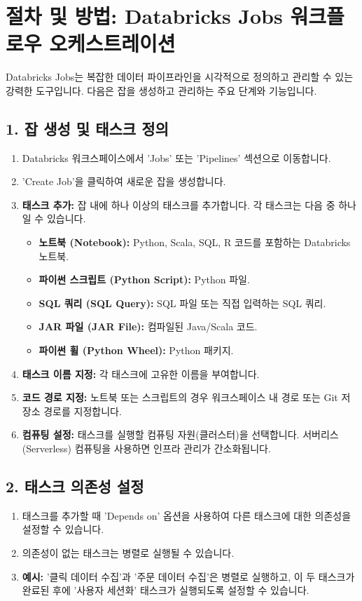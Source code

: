 \documentclass[11pt,a4paper]{article}
\theoremstyle{definition}
\begin{document}
\newpage
\section{절차 및 방법: Databricks Jobs 워크플로우 오케스트레이션}

Databricks Jobs는 복잡한 데이터 파이프라인을 시각적으로 정의하고 관리할 수 있는 강력한 도구입니다. 다음은 잡을 생성하고 관리하는 주요 단계와 기능입니다.

\subsection*{1. 잡 생성 및 태스크 정의}
\begin{enumerate}
    \item Databricks 워크스페이스에서 'Jobs' 또는 'Pipelines' 섹션으로 이동합니다.
    \item 'Create Job'을 클릭하여 새로운 잡을 생성합니다.
    \item \textbf{태스크 추가:} 잡 내에 하나 이상의 태스크를 추가합니다. 각 태스크는 다음 중 하나일 수 있습니다.
    \begin{itemize}
        \item \textbf{노트북 (Notebook):} Python, Scala, SQL, R 코드를 포함하는 Databricks 노트북.
        \item \textbf{파이썬 스크립트 (Python Script):} Python 파일.
        \item \textbf{SQL 쿼리 (SQL Query):} SQL 파일 또는 직접 입력하는 SQL 쿼리.
        \item \textbf{JAR 파일 (JAR File):} 컴파일된 Java/Scala 코드.
        \item \textbf{파이썬 휠 (Python Wheel):} Python 패키지.
    \end{itemize}
    \item \textbf{태스크 이름 지정:} 각 태스크에 고유한 이름을 부여합니다.
    \item \textbf{코드 경로 지정:} 노트북 또는 스크립트의 경우 워크스페이스 내 경로 또는 Git 저장소 경로를 지정합니다.
    \item \textbf{컴퓨팅 설정:} 태스크를 실행할 컴퓨팅 자원(클러스터)을 선택합니다. 서버리스(Serverless) 컴퓨팅을 사용하면 인프라 관리가 간소화됩니다.
\end{enumerate}

\subsection*{2. 태스크 의존성 설정}
\begin{enumerate}
    \item 태스크를 추가할 때 'Depends on' 옵션을 사용하여 다른 태스크에 대한 의존성을 설정할 수 있습니다.
    \item 의존성이 없는 태스크는 병렬로 실행될 수 있습니다.
    \item \textbf{예시:} '클릭 데이터 수집'과 '주문 데이터 수집'은 병렬로 실행하고, 이 두 태스크가 완료된 후에 '사용자 세션화' 태스크가 실행되도록 설정할 수 있습니다.
\end{enumerate}
\end{document}
